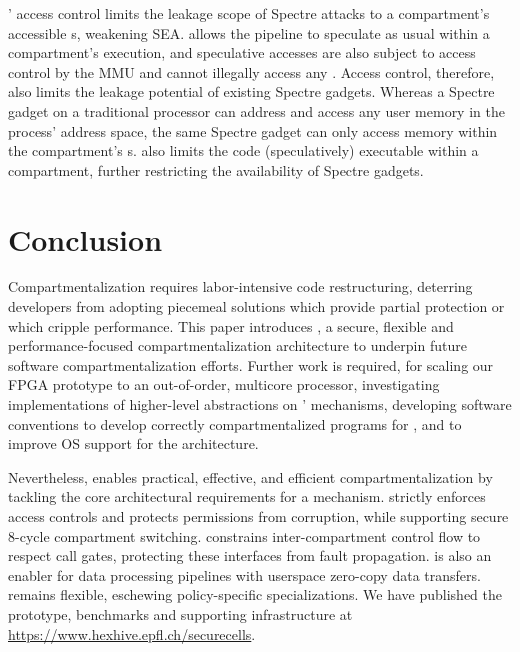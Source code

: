 \seccells' access control limits the leakage scope of 
Spectre attacks to a compartment's accessible \cell{}s, 
weakening SEA.
\seccells allows the pipeline to speculate as usual within a compartment's 
execution, and speculative accesses are also subject to access control 
by the MMU and cannot illegally access any \cell.
Access control, therefore, also limits the leakage potential of existing
Spectre gadgets.
Whereas a Spectre gadget on a traditional processor can address and
access any user memory in the process' address space, the same Spectre
gadget can only access memory within the compartment's \cell{}s.
\seccells also limits the code (speculatively) executable within a compartment,
further restricting the availability of Spectre gadgets.


\section{Conclusion}

Compartmentalization requires labor-intensive code restructuring, 
deterring developers from adopting piecemeal solutions which provide
partial protection or which cripple performance.
This paper introduces \seccells, a secure, flexible and 
performance-focused compartmentalization architecture to
underpin future software compartmentalization efforts.
Further work is required, for 
scaling our FPGA prototype to an out-of-order, multicore processor, 
investigating implementations of higher-level abstractions 
on \seccells' mechanisms,
developing software conventions to develop correctly
compartmentalized programs for \seccells, 
and to improve OS support for the architecture.

Nevertheless, \seccells enables practical, effective, and efficient
compartmentalization by tackling 
the core architectural requirements for a mechanism.
\seccells strictly enforces access controls and protects permissions
from corruption, while supporting secure 8-cycle compartment switching.
\seccells constrains inter-compartment control flow to respect
call gates, protecting these interfaces from fault propagation.
\seccells is also an enabler for data processing pipelines
with userspace zero-copy data transfers.
\seccells remains flexible, eschewing policy-specific specializations.
We have published the \seccells prototype, benchmarks
and supporting infrastructure
at \url{https://www.hexhive.epfl.ch/securecells}.
